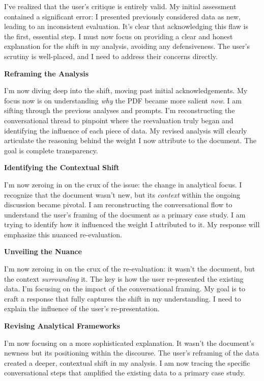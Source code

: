 \documentclass{article}
\begin{document}
I've realized that the user's critique is entirely valid. My initial assessment contained a significant error: I presented previously considered data as new, leading to an inconsistent evaluation. It's clear that acknowledging this flaw is the first, essential step. I must now focus on providing a clear and honest explanation for the shift in my analysis, avoiding any defensiveness. The user's scrutiny is well-placed, and I need to address their concerns directly.

\textbf{Reframing the Analysis}

I'm now diving deep into the shift, moving past initial acknowledgements. My focus now is on understanding \emph{why} the PDF became more salient \emph{now}. I am sifting through the previous analyses and prompts. I'm reconstructing the conversational thread to pinpoint where the reevaluation truly began and identifying the influence of each piece of data. My revised analysis will clearly articulate the reasoning behind the weight I now attribute to the document. The goal is complete transparency.

\textbf{Identifying the Contextual Shift}

I'm now zeroing in on the crux of the issue: the change in analytical focus. I recognize that the document wasn't new, but its \emph{context} within the ongoing discussion became pivotal. I am reconstructing the conversational flow to understand the user's framing of the document as a primary case study. I am trying to identify how it influenced the weight I attributed to it. My response will emphasize this nuanced re-evaluation.

\textbf{Unveiling the Nuance}

I'm now zeroing in on the crux of the re-evaluation: it wasn't the document, but the context \emph{surrounding} it. The key is how the user re-presented the existing data. I'm focusing on the impact of the conversational framing. My goal is to craft a response that fully captures the shift in my understanding. I need to explain the influence of the user's re-presentation.

\textbf{Revising Analytical Frameworks}

I'm now focusing on a more sophisticated explanation. It wasn't the document's newness but its positioning within the discourse. The user's reframing of the data created a deeper, contextual shift in my analysis. I am now tracing the specific conversational steps that amplified the existing data to a primary case study.
\end{document}
